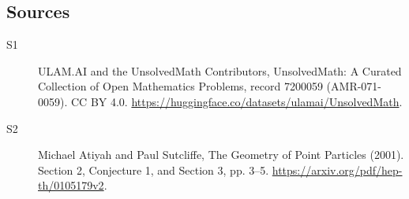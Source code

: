 \documentclass[11pt]{article}
\begin{document}
\subsection{Sources}
\begin{description}
\item[\hypertarget{source:7200059:1}{S1}] ULAM.AI and the UnsolvedMath Contributors, UnsolvedMath: A Curated Collection of Open Mathematics Problems, record 7200059 (AMR-071-0059). CC BY 4.0. \url{https://huggingface.co/datasets/ulamai/UnsolvedMath}.
\item[\hypertarget{source:7200059:2}{S2}] Michael Atiyah and Paul Sutcliffe, The Geometry of Point Particles (2001). Section 2, Conjecture 1, and Section 3, pp. 3–5. \url{https://arxiv.org/pdf/hep-th/0105179v2}.
\end{description}
\label{end:7200059}
\end{document}
